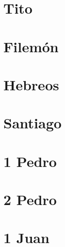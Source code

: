 \chapter{Tito}
\begin{multicols}{2}
  \raggedcolumns
  \parskip=0pt \relax
  
\end{multicols}

\chapter{Filemón}
\begin{multicols}{2}
  \raggedcolumns
  \parskip=0pt \relax
  
\end{multicols}

\chapter{Hebreos}
\begin{multicols}{2}
  \raggedcolumns
  \parskip=0pt \relax
  
\end{multicols}

\chapter{Santiago}
\begin{multicols}{2}
  \raggedcolumns
  \parskip=0pt \relax
  
\end{multicols}

\chapter{1 Pedro}
\begin{multicols}{2}
  \raggedcolumns
  \parskip=0pt \relax
  
\end{multicols}

\chapter{2 Pedro}
\begin{multicols}{2}
  \raggedcolumns
  \parskip=0pt \relax
  
\end{multicols}

\chapter{1 Juan}
\begin{multicols}{2}
  \raggedcolumns
  \parskip=0pt \relax
  
\end{multicols}

